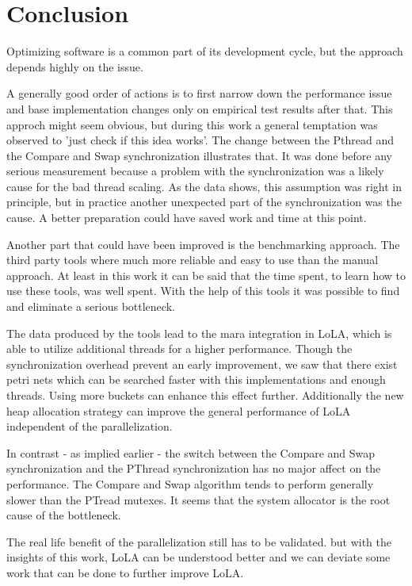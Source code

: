 \chapter{Conclusion}
Optimizing software is a common part of its development cycle, but the approach depends highly on the issue.

A generally good order of actions is to first narrow down the performance issue and base implementation changes only on empirical test results after that. This approch might seem obvious, but during this work a general temptation was observed to 'just check if this idea works'. The change between the Pthread and the Compare and Swap synchronization illustrates that. It was done before any serious measurement because a problem with the synchronization was a likely cause for the bad thread scaling. As the data shows, this assumption was right in principle, but in practice another unexpected part of the synchronization was the cause. A better preparation could have saved work and time at this point.

Another part that could have been improved is the benchmarking approach. The third party tools where much more reliable and easy to use than the manual approach. At least in this work it can be said that the time spent, to learn how to use these tools, was well spent. With the help of this tools it was possible to find and eliminate a serious bottleneck.

The data produced by the tools lead to the mara integration in LoLA, which is able to utilize additional threads for a higher performance. Though the synchronization overhead prevent an early improvement, we saw that there exist petri nets which can be searched faster with this implementations and enough threads. Using more buckets can enhance this effect further. Additionally the new heap allocation strategy can improve the general performance of LoLA independent of the parallelization.

In contrast - as implied earlier - the switch between the Compare and Swap synchronization and the PThread synchronization has no major affect on the performance. The Compare and Swap algorithm tends to perform generally slower than the PTread mutexes. It seems that the system allocator is the root cause of the bottleneck.

The real life benefit of the parallelization still has to be validated. but with the insights of this work, LoLA can be understood better and we can deviate some work that can be done to further improve LoLA. 